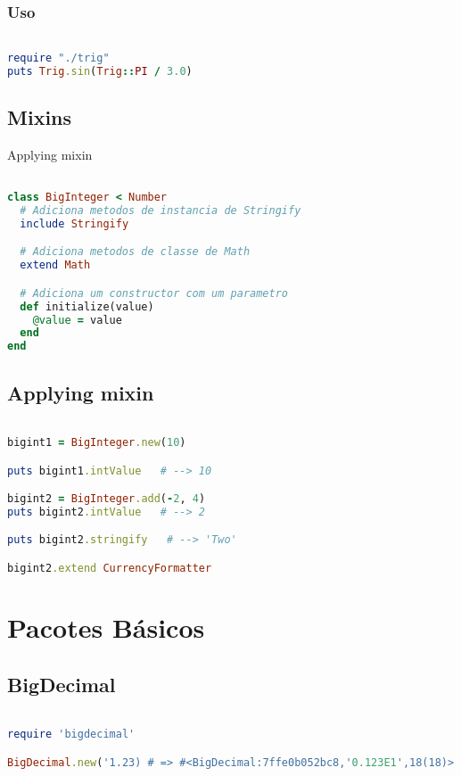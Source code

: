 \documentclass[serif,mathserif]{article}
\begin{document}
\subsubsection{Uso}

\begin{lstlisting}[language=ruby]

require "./trig"
puts Trig.sin(Trig::PI / 3.0)
\end{lstlisting}

\subsection{Mixins}

Applying mixin

\begin{lstlisting}[language=ruby]

class BigInteger < Number
  # Adiciona metodos de instancia de Stringify
  include Stringify

  # Adiciona metodos de classe de Math
  extend Math

  # Adiciona um constructor com um parametro
  def initialize(value)
    @value = value
  end
end
\end{lstlisting}

\subsection{Applying mixin}

\begin{lstlisting}[language=ruby]

bigint1 = BigInteger.new(10)

puts bigint1.intValue   # --> 10

bigint2 = BigInteger.add(-2, 4)
puts bigint2.intValue   # --> 2

puts bigint2.stringify   # --> 'Two'

bigint2.extend CurrencyFormatter
\end{lstlisting}

\section{Pacotes Básicos}

\subsection{BigDecimal}

\begin{lstlisting}[language=ruby]

require 'bigdecimal'

BigDecimal.new('1.23) # => #<BigDecimal:7ffe0b052bc8,'0.123E1',18(18)>
\end{lstlisting}
\end{document}
